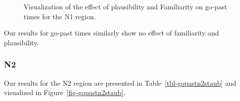 \documentclass[
  letterpaper,
  DIV=11,
  numbers=noendperiod,
  nottoc]{scrreprt}
\begin{document}
\begin{figure}[htbp]


\caption{\label{fig-gopastn1staub}Visualization of the effect of
plausibility and Familiarity on go-past times for the N1 region.}

\end{figure}%

Our results for go-past times similarly show no effect of familiarity
and plausibility.

\subsubsection{N2}\label{n2-6}

Our results for the N2 region are presented in
Table~\ref{tbl-gopastn2staub} and visualized in
Figure~\ref{fig-gopastn2staub}.
\end{document}
